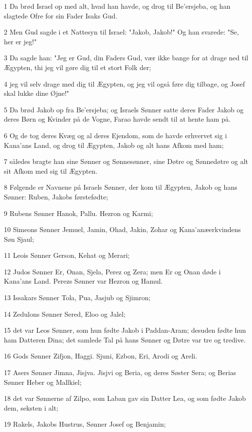 \par 1 Da brød Israel op med alt, hvad han havde, og drog til Be'ersjeba, og han slagtede Ofre for sin Fader Isaks Gud.
\par 2 Men Gud sagde i et Nattesyn til Israel: "Jakob, Jakob!" Og han svarede: "Se, her er jeg!"
\par 3 Da sagde han: "Jeg er Gud, din Faders Gud, vær ikke bange for at drage ned til Ægypten, thi jeg vil gøre dig til et stort Folk der;
\par 4 jeg vil selv drage med dig til Ægypten, og jeg vil også føre dig tilbage, og Josef skal lukke dine Øjne!"
\par 5 Da brød Jakob op fra Be'ersjeba; og Israels Sønner satte deres Fader Jakob og deres Børn og Kvinder på de Vogne, Farao havde sendt til at hente ham på.
\par 6 Og de tog deres Kvæg og al deres Ejendom, som de havde erhvervet sig i Kana'ans Land, og drog til Ægypten, Jakob og alt hans Afkom med ham;
\par 7 således bragte han sine Sønner og Sønnesønner, sine Døtre og Sønnedøtre og alt sit Afkom med sig til Ægypten.
\par 8 Følgende er Navnene på Israels Sønner, der kom til Ægypten, Jakob og hans Sønner: Ruben, Jakobs førstefødte;
\par 9 Rubens Sønner Hanok, Pallu. Hezron og Karmi;
\par 10 Simeons Sønner Jemuel, Jamin, Ohad, Jakin, Zohar og Kana'anæerkvindens Søn Sjaul;
\par 11 Leois Sønner Gerson, Kehat og Merari;
\par 12 Judos Sønner Er, Onan, Sjela, Perez og Zera; men Er og Onan døde i Kana'ans Land. Perezs Sønner var Hezron og Hamul.
\par 13 Issakars Sønner Tola, Pua, Jasjub og Sjimron;
\par 14 Zedulons Sønner Sered, Eloo og Jalel;
\par 15 det var Leos Sønner, som hun fødte Jakob i Paddan-Aram; desuden fødte hun ham Datteren Dina; det samlede Tal på hans Sønner og Døtre var tre og tredive.
\par 16 Gods Sønner Zifjon, Haggi. Sjuni, Ezbon, Eri, Arodi og Areli.
\par 17 Asers Sønner Jimna, Jisjva. Jisjvi og Beria, og deres Søster Sera; og Berias Sønner Heber og Mallkiel;
\par 18 det var Sønnerne af Zilpo, som Laban gav sin Datter Lea, og som fødte Jakob dem, seksten i alt;
\par 19 Rakels, Jakobs Hustrus, Sønner Josef og Benjamin;
